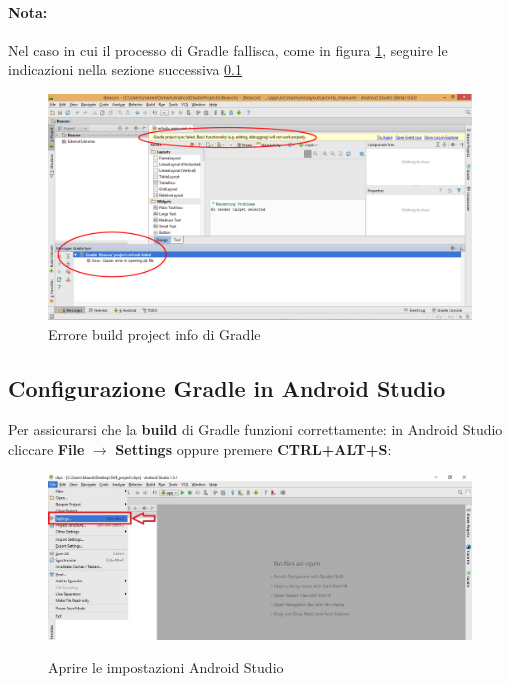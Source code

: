 \documentclass[../ManualeSviluppatore.tex]{subfiles}
\begin{document}
		\paragraph*{Nota:}
			Nel caso in cui il processo di Gradle fallisca, come in figura \ref{fig:GradleError}, seguire le indicazioni nella sezione successiva \ref{subsec:ConfigGradleAS}
			
		\begin{figure} [h]
			\centering
			\includegraphics[width=\textwidth]{img/GradleError}
			\caption{Errore build project info di Gradle}
			\label{fig:GradleError}
		\end{figure}
		
		\newpage
		\subsection{Configurazione Gradle in Android Studio}
		\label{subsec:ConfigGradleAS}
			Per assicurarsi che la \textbf{build} di Gradle funzioni correttamente: in Android Studio cliccare \textbf{File} $\rightarrow$ \textbf{Settings} oppure premere \textbf{CTRL+ALT+S}:
			
		
		\begin{figure} [h]
			\centering
			\includegraphics[width=\textwidth]{img/settings}
			\label{fig:Settings}
			\caption{Aprire le impostazioni Android Studio}
		\end{figure}
		
\end{document}
